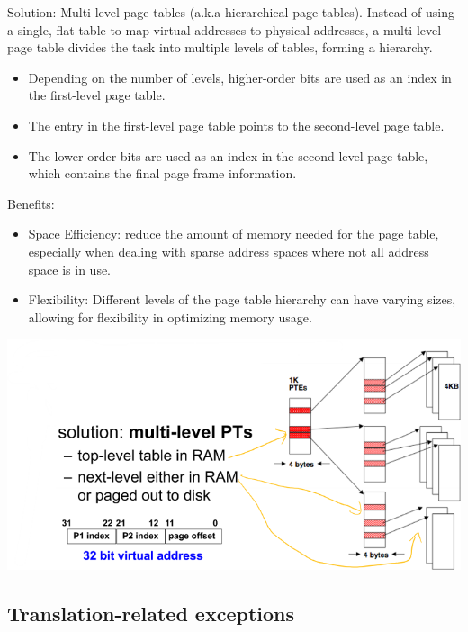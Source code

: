 \documentclass[letterpaper,12pt]{article}
\begin{document}
Solution: Multi-level page tables (a.k.a hierarchical page tables). Instead of using a single, flat table to map virtual addresses to physical addresses, a multi-level page table divides the task into multiple levels of tables, forming a hierarchy.

\begin{itemize}
    \item Depending on the number of levels, higher-order bits are used as an index in the first-level page table.
    \item The entry in the first-level page table points to the second-level page table.
    \item The lower-order bits are used as an index in the second-level page table, which contains the final page frame information.
\end{itemize}

Benefits:
\begin{itemize}
    \item Space Efficiency: reduce the amount of memory needed for the page table, especially when dealing with sparse address spaces where not all address space is in use.
    \item Flexibility: Different levels of the page table hierarchy can have varying sizes, allowing for flexibility in optimizing memory usage.
\end{itemize}

\includegraphics*[scale = 0.8]{./Image/Multi-level PT.png}

\subsection{Translation-related exceptions}
\end{document}
